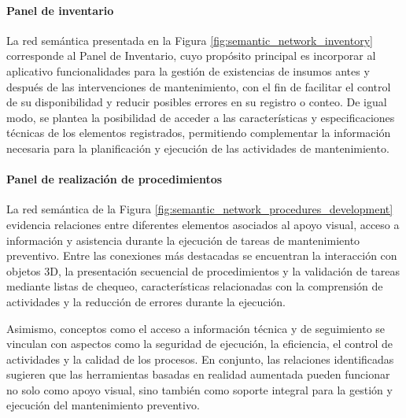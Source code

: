                

            \paragraph{Panel de inventario}
            
                La red semántica presentada en la Figura \ref{fig:semantic_network_inventory} corresponde al Panel de Inventario, cuyo propósito principal es incorporar al aplicativo funcionalidades para la gestión de existencias de insumos antes y después de las intervenciones de mantenimiento, con el fin de facilitar el control de su disponibilidad y reducir posibles errores en su registro o conteo. De igual modo, se plantea la posibilidad de acceder a las características y especificaciones técnicas de los elementos registrados, permitiendo complementar la información necesaria para la planificación y ejecución de las actividades de mantenimiento. 

                

            \paragraph{Panel de realización de procedimientos}
            
                La red semántica de la Figura \ref{fig:semantic_network_procedures_development} evidencia relaciones entre diferentes elementos asociados al apoyo visual, acceso a información y asistencia durante la ejecución de tareas de mantenimiento preventivo. Entre las conexiones más destacadas se encuentran la interacción con objetos 3D, la presentación secuencial de procedimientos y la validación de tareas mediante listas de chequeo, características relacionadas con la comprensión de actividades y la reducción de errores durante la ejecución.

                Asimismo, conceptos como el acceso a información técnica y de seguimiento se vinculan con aspectos como la seguridad de ejecución, la eficiencia, el control de actividades y la calidad de los procesos. En conjunto, las relaciones identificadas sugieren que las herramientas basadas en realidad aumentada pueden funcionar no solo como apoyo visual, sino también como soporte integral para la gestión y ejecución del mantenimiento preventivo.

